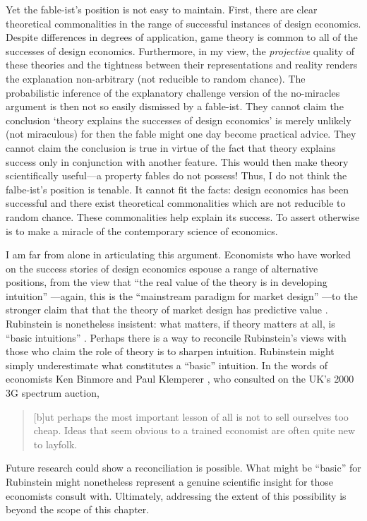 Yet the fable-ist's position is not easy to maintain. First, there are clear theoretical commonalities in the range of successful instances of design economics. Despite differences in degrees of application, game theory is common to all of the successes of design economics. Furthermore, in my view, the \textit{projective} quality of these theories and the tightness between their representations and reality renders the explanation non-arbitrary (not reducible to random chance). The probabilistic inference of the explanatory challenge version of the no-miracles argument is then not so easily dismissed by a fable-ist. They cannot claim the conclusion `theory explains the successes of design economics' is merely unlikely (not miraculous) for then the fable might one day become practical advice. They cannot claim the conclusion is true in virtue of the fact that theory explains success only in conjunction with another feature. This would then make theory scientifically useful---a property fables do not possess! Thus, I do not think the falbe-ist's position is tenable. It cannot fit the facts: design economics has been successful and there exist theoretical commonalities which are not reducible to random chance. These commonalities help explain its success. To assert otherwise is to make a miracle of the contemporary science of economics.

I am far from alone in articulating this argument. Economists who have worked on the success stories of design economics espouse a range of alternative positions, from the view that ``the real value of the theory is in developing intuition'' \autocite[172]{mcafee1996}---again, this is the ``mainstream paradigm for market design'' \autocite[10]{sönmez2023minimalist}---to the stronger claim that that the theory of market design has predictive value \autocite{roth2002}. Rubinstein is nonetheless insistent: what matters, if theory matters at all, is ``basic intuitions'' \autocite[above]{rubinstein2012}. Perhaps there is a way to reconcile Rubinstein's views with those who claim the role of theory is to sharpen intuition. Rubinstein might simply underestimate what constitutes a ``basic'' intuition. In the words of economists Ken Binmore and Paul Klemperer \autocite*[C95]{binmore2002}, who consulted on the UK's 2000 3G spectrum auction, 
\begin{quote}
    [b]ut perhaps the most important lesson of all is not to sell ourselves too cheap. Ideas that seem obvious to a trained economist are often quite new to layfolk. 
\end{quote}
\noindent Future research could show a reconciliation is possible. What might be ``basic'' for Rubinstein might nonetheless represent a genuine scientific insight for those economists consult with. Ultimately, addressing the extent of this possibility is beyond the scope of this chapter.


